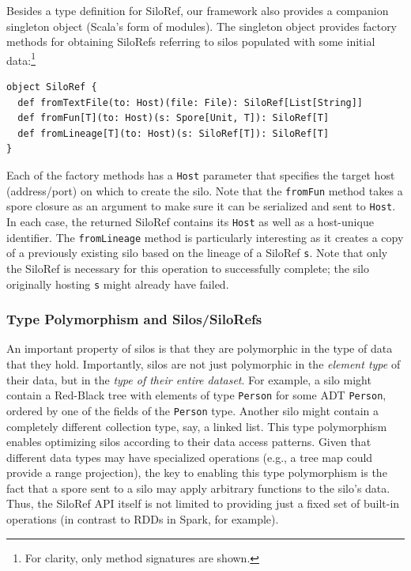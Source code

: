 \documentclass[preprint]{sigplanconf}
\theoremstyle{definition}
\theoremstyle{definition}
\begin{document}
Besides a type definition for SiloRef, our framework also provides a companion
singleton object (Scala's form of modules). The singleton object provides
factory methods for obtaining SiloRefs referring to silos populated with some
initial data:\footnote{For clarity, only method signatures are shown.}

\begin{lstlisting}
object SiloRef {
  def fromTextFile(to: Host)(file: File): SiloRef[List[String]]
  def fromFun[T](to: Host)(s: Spore[Unit, T]): SiloRef[T]
  def fromLineage[T](to: Host)(s: SiloRef[T]): SiloRef[T]
}
\end{lstlisting}
\noindent
Each of the factory methods has a \verb|Host| parameter that specifies the 
target host (address/port) on which to create the silo. Note that the 
\verb|fromFun| method takes a spore closure as an 
argument to make sure it can be serialized and sent to \verb|Host|. In each 
case, the returned SiloRef contains its \verb|Host| as well as a host-unique 
identifier.  The \verb|fromLineage| method is particularly interesting as it 
creates a copy of a previously existing silo based on the lineage of a SiloRef 
\verb|s|. Note that only the SiloRef is necessary for this operation to 
successfully complete; the silo originally hosting \verb|s| might already have 
failed.

\subsubsection{Type Polymorphism and Silos/SiloRefs}

An important property of silos is that they are polymorphic in the type of data
that they hold. Importantly, silos are not just polymorphic in the {\em element
type} of their data, but in the {\em type of their entire dataset}. For example,
a silo might contain a Red-Black tree with elements of type \verb|Person| for
some ADT \verb|Person|, ordered by one of the fields of the \verb|Person| type.
Another silo might contain a completely different collection type, say, a linked
list. This type polymorphism enables optimizing silos according to their data
access patterns. Given that different data types may have specialized operations
(e.g., a tree map could provide a range projection), the key to enabling this
type polymorphism is the fact that a spore sent to a silo may apply arbitrary
functions to the silo's data. Thus, the SiloRef API itself is not limited to
providing just a fixed set of built-in operations (in contrast to RDDs in Spark,
for example).
\end{document}
